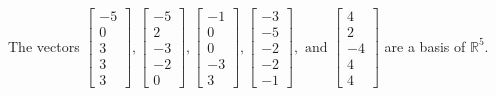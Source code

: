 \begin{exercise}
\begin{exerciseStatement}
  \end{exerciseStatement}
  \begin{exerciseAnswer}
   The vectors \(\left[\begin{array}{r}
-5 \\
0 \\
3 \\
3 \\
3
\end{array}\right] , \left[\begin{array}{r}
-5 \\
2 \\
-3 \\
-2 \\
0
\end{array}\right] , \left[\begin{array}{r}
-1 \\
0 \\
0 \\
-3 \\
3
\end{array}\right] , \left[\begin{array}{r}
-3 \\
-5 \\
-2 \\
-2 \\
-1
\end{array}\right] , \text{ and } \left[\begin{array}{r}
4 \\
2 \\
-4 \\
4 \\
4
\end{array}\right]\) 
  	 are  a basis of \(\mathbb{R}^5\).
  


  \end{exerciseAnswer}
\end{exercise}